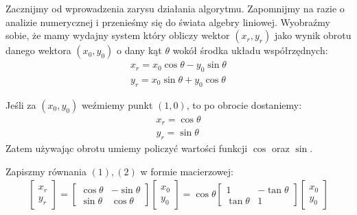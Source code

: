 \documentclass[12pt]{extarticle}
\theoremstyle{remark}
\theoremstyle{definition}
\theoremstyle{definition}
\begin{document}
Zacznijmy od wprowadzenia zarysu działania algorytmu. Zapomnijmy na razie o analizie numerycznej i przenieśmy się do świata algebry liniowej. Wyobraźmy sobie, że mamy wydajny system który obliczy wektor $(x_r, y_r)$ jako wynik obrotu danego wektora $(x_0, y_0)$ o dany kąt $\theta$ wokół środka układu współrzędnych:
\begin{align}
  x_r = x_0\cos\theta - y_0\sin\theta \\
  y_r = x_0\sin\theta + y_0\cos\theta 
\end{align}

Jeśli za $(x_0, y_0)$ weźmiemy punkt $(1, 0)$, to po obrocie dostaniemy:
\begin{align*}
  x_r = \cos\theta \\
  y_r = \sin\theta
\end{align*}
Zatem używając obrotu umiemy policzyć wartości funkcji $\cos$ oraz $\sin$.

Zapiszmy równania $(1), (2)$ w formie macierzowej:
\begin{align}
  \begin{bmatrix}
    x_r \\ y_r
  \end{bmatrix}
  = \begin{bmatrix}
    \cos\theta          & -\sin\theta \\
    \sin\theta & \cos\theta
  \end{bmatrix}
  \begin{bmatrix}
    x_0 \\ y_0
  \end{bmatrix}
  = \cos\theta
  \begin{bmatrix}
    1          & -\tan\theta \\
    \tan\theta & 1
  \end{bmatrix}
  \begin{bmatrix}
    x_0 \\ y_0
  \end{bmatrix}
\end{align}
\end{document}
